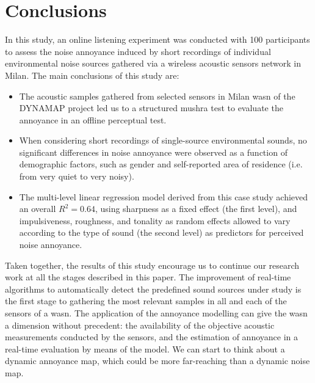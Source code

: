 

\section{Conclusions}

 In this study, an online listening experiment was conducted with 100 participants to assess the noise annoyance induced by short recordings of individual environmental noise sources gathered via a wireless acoustic sensors network in Milan. The main conclusions of this study are:

 \begin{itemize}
   \item The acoustic samples gathered from selected sensors in Milan \gls{wasn} of the DYNAMAP project led us to a structured \gls{mushra} test to evaluate the annoyance in an offline perceptual test.
   \item When considering short recordings of single-source environmental sounds, no significant differences in noise annoyance were observed as a function of demographic factors, such as gender and self-reported area of residence (i.e. from very quiet to very noisy).
   \item The multi-level linear regression model derived from this case study achieved an overall $R^2=0.64$, using sharpness as a fixed effect (the first level), and impulsiveness, roughness, and tonality as random effects allowed to vary according to the type of sound (the second level) as predictors for perceived noise annoyance.
 \end{itemize}

 Taken together, the results of this study encourage us to continue our research work at all the stages described in this paper. The improvement of real-time algorithms to automatically detect the predefined sound sources under study is the first stage to gathering the most relevant samples in all and each of the sensors of a \gls{wasn}. The application of the annoyance modelling can give the \gls{wasn} a dimension without precedent: the availability of the objective acoustic measurements conducted by the sensors, and the estimation of annoyance in a real-time evaluation by means of the model. We can start to think about a dynamic annoyance map, which could be more far-reaching than a dynamic noise map.